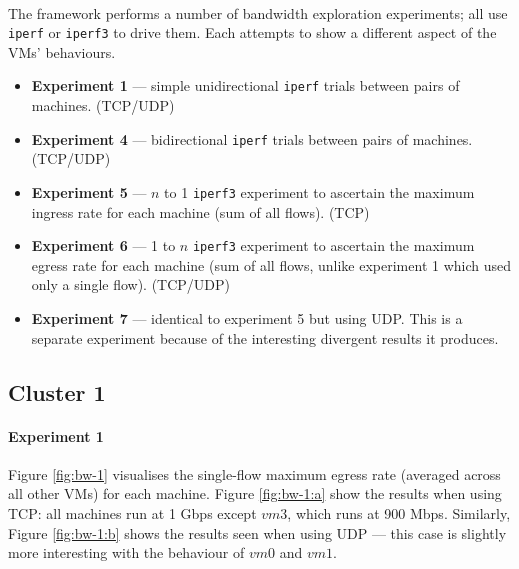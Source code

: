 \documentclass[a4paper,10pt]{article}
\begin{document}
\paragraph{} The framework performs a number of bandwidth exploration experiments; all use \texttt{iperf} or \texttt{iperf3} to drive them. Each attempts to show a different aspect of the VMs' behaviours.
\begin{itemize}
    \item \textbf{Experiment 1} --- simple unidirectional \texttt{iperf} trials between pairs of machines. (TCP/UDP)
    \item \textbf{Experiment 4} --- bidirectional \texttt{iperf} trials between pairs of machines. (TCP/UDP)
    \item \textbf{Experiment 5} --- $n$ to 1 \texttt{iperf3} experiment to ascertain the maximum ingress rate for each machine (sum of all flows). (TCP)
    \item \textbf{Experiment 6} --- 1 to $n$ \texttt{iperf3} experiment to ascertain the maximum egress rate for each machine (sum of all flows, unlike experiment 1 which used only a single flow). (TCP/UDP)
    \item \textbf{Experiment 7} --- identical to experiment 5 but using UDP. This is a separate experiment because of the interesting divergent results it produces.
\end{itemize}

\subsection*{Cluster 1}
\paragraph{Experiment 1} Figure \ref{fig:bw-1} visualises the single-flow maximum egress rate (averaged across all other VMs) for each machine. Figure \ref{fig:bw-1:a} show the results when using TCP: all machines run at 1 Gbps except $vm3$, which runs at 900 Mbps. Similarly, Figure \ref{fig:bw-1:b} shows the results seen when using UDP --- this case is slightly more interesting with the behaviour of $vm0$ and $vm1$. 
\end{document}
